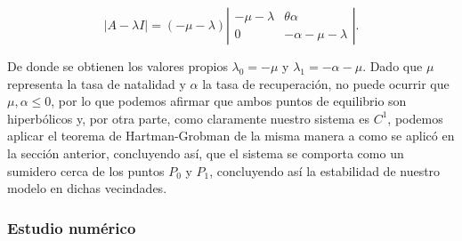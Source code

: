$$|A-\lambda I|=(-\mu-\lambda)
\left|\begin{array}{cc}
-\mu-\lambda & \theta\alpha\\
0 & -\alpha-\mu -\lambda
\end{array}\right|.$$

De donde se obtienen los valores propios $\lambda_0 = -\mu$ y $\lambda_1 = -\alpha-\mu$. Dado que $\mu$ representa la tasa de natalidad y $\alpha$ la tasa de recuperación, no puede ocurrir que $\mu,\alpha\leq0$, por lo que podemos afirmar que ambos puntos de equilibrio son hiperbólicos y, por otra parte, como claramente nuestro sistema es $C^1$, podemos aplicar el teorema de Hartman-Grobman de la misma manera a como se aplicó en la sección anterior, concluyendo así, que el sistema se comporta como un sumidero cerca de los puntos $P_0$ y $P_1$, concluyendo así la estabilidad de nuestro modelo en dichas vecindades.






\subsubsection{Estudio numérico}

